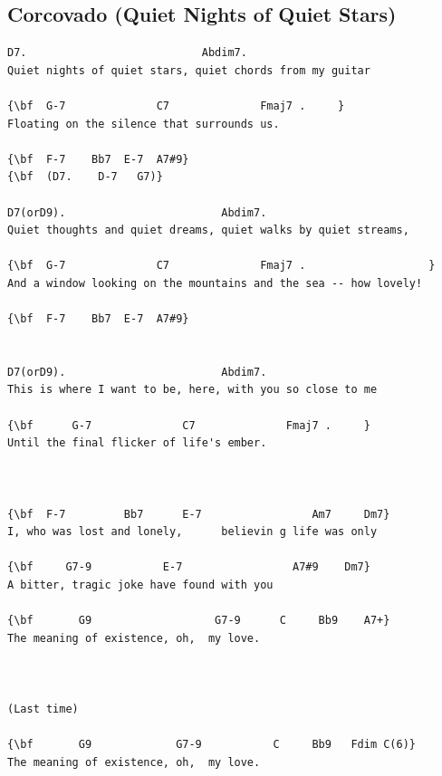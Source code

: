 \documentclass[a4paper]{article}
\begin{document}
\subsection{Corcovado (Quiet Nights of Quiet Stars)}
\begin{Verbatim}[commandchars=\\\{\}]
D7.                           Abdim7.
Quiet nights of quiet stars, quiet chords from my guitar

{\bf  G-7              C7              Fmaj7 .     }
Floating on the silence that surrounds us.

{\bf  F-7    Bb7  E-7  A7#9}
{\bf  (D7.    D-7   G7)}

D7(orD9).                        Abdim7.     
Quiet thoughts and quiet dreams, quiet walks by quiet streams,

{\bf  G-7              C7              Fmaj7 .                   }
And a window looking on the mountains and the sea -- how lovely!

{\bf  F-7    Bb7  E-7  A7#9}


D7(orD9).                        Abdim7.
This is where I want to be, here, with you so close to me

{\bf      G-7              C7              Fmaj7 .     }
Until the final flicker of life's ember.



{\bf  F-7         Bb7      E-7                 Am7     Dm7}
I, who was lost and lonely,      believin g life was only

{\bf     G7-9           E-7                 A7#9    Dm7}
A bitter, tragic joke have found with you

{\bf       G9                   G7-9      C     Bb9    A7+}
The meaning of existence, oh,  my love.



(Last time)

{\bf       G9             G7-9           C     Bb9   Fdim C(6)}
The meaning of existence, oh,  my love.

\end{Verbatim}
\newpage
\end{document}
